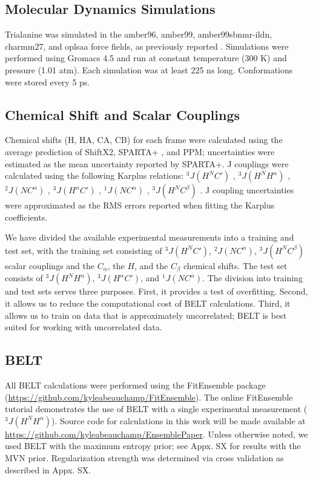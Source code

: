 \documentclass[journal=jacsat,manuscript=article]{achemso}
\begin{document}
\subsection{Molecular Dynamics Simulations}

Trialanine was simulated in the amber96\cite{kollman1996}, amber99\cite{wang2000}, amber99sbnmr-ildn\cite{li2010}, charmm27\cite{mackerell2004extending,bjelkmar2010implementation}, and oplsaa\cite{kaminski2001evaluation} force fields, as previously reported \cite{beauchamp2012protein}.  Simulations were performed using Gromacs 4.5 \cite{hess2008} and run at constant temperature (300 K) and pressure (1.01 atm).  Each simulation was at least 225 ns long.  Conformations were stored every 5 ps.  

\subsection{Chemical Shift and Scalar Couplings}

Chemical shifts (H, HA, CA, CB) for each frame were calculated using the average prediction of ShiftX2\cite{han2011shiftx2}, SPARTA+ \cite{Shen2010}, and PPM\cite{li2012ppm}; uncertainties were estimated as the mean uncertainty reported by SPARTA+. J couplings were calculated using the following Karplus relations: $^3J(H^N C')$ \cite{Schmidt1999}, $^3J(H^N H^\alpha)$ \cite{vogeli2007limits}, $^2J(N C^\alpha)$ \cite{Graf2007}, $^3J(H^\alpha C')$ \cite{Schmidt1999}, $^1J(N C^\alpha)$ \cite{Graf2007}, $^3J(H^N C^\beta)$ \cite{vogeli2007limits}.  J coupling uncertainties were approximated as the RMS errors reported when fitting the Karplus coefficients.  

We have divided the available experimental measurements into a training and test set, with the training set consisting of $^3J(H^N C')$,  $^2J(N C^\alpha)$, $^3J(H^N C^\beta)$ scalar couplings and the $C_\alpha$, the $H$, and the $C_\beta$ chemical shifts.  The test set consists of $^3J(H^N H^\alpha)$, $^3J(H^\alpha C')$, and $^1J(N C^\alpha)$.  The division into training and test sets serves three purposes.  First, it provides a test of overfitting.  Second, it allows us to reduce the computational cost of BELT calculations.  Third, it allows us to train on data that is approximately uncorrelated; BELT is best suited for working with uncorrelated data.  

\subsection{BELT}

All BELT calculations were performed using the FitEnsemble package (\url{https://github.com/kyleabeauchamp/FitEnsemble}).  The online FitEnsemble tutorial demonstrates the use of BELT with a single experimental measurement ($^3J(H^N H^\alpha)$).  Source code for calculations in this work will be made available at \url{https://github.com/kyleabeauchamp/EnsemblePaper}.  Unless otherwise noted, we used BELT with the maximum entropy prior; see Appx. SX for results with the MVN prior.  Regularization strength was determined via cross validation as described in Appx. SX.  



\end{document}

